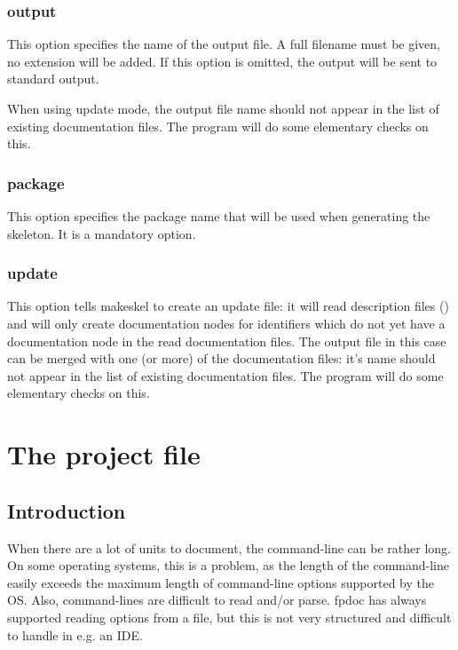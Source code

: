 \subsection{output}
\label{suse:msoutput}
This option specifies the name of the output file. A full filename must be
given, no extension will be added. If this option is omitted, the output
will be sent to standard output.

When using update mode, the output file name should not appear in the list of
existing documentation files. The  program will do some
elementary checks on this.

\subsection{package}
\label{suse:mspackage}
This option specifies the package name that will be used when generating the
skeleton. It is a mandatory option. 

\subsection{update}
\label{suse:update}
This option tells makeskel to create an update file: it will read
description files () and will only create documentation nodes
for identifiers which do not yet have a documentation node in the read
documentation files. The output file in this case can be merged with one (or
more) of the documentation files: it's name should not appear in the list of
existing documentation files. The  program will do some
elementary checks on this.

\chapter{The project file}
\label{ch:projectfile}

\section{Introduction}
When there are a lot of units to document, the command-line can be rather
long. On some operating systems, this is a problem, as the length of the
command-line easily exceeds the maximum length of command-line options
supported by the OS. Also, command-lines are difficult to read and/or 
parse. fpdoc has always supported reading options from a file, but 
this is not very structured and difficult to handle in e.g. an IDE. 

